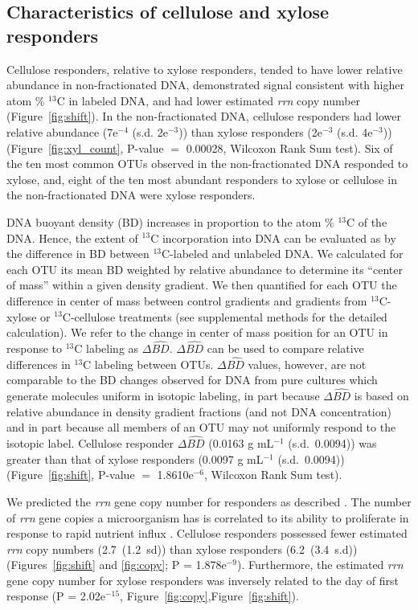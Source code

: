 \subsection{Characteristics of cellulose and xylose responders}
Cellulose responders, relative to xylose responders, tended to have lower
relative abundance in non-fractionated DNA, demonstrated signal consistent with
higher atom \% $^{13}$C in labeled DNA, and had lower estimated \textit{rrn}
copy number (Figure~\ref{fig:shift}). In the non-fractionated DNA, cellulose
responders had lower relative abundance (7e$^{-4}$ (s.d. 2e$^{-3}$)) than
xylose responders (2e$^{-3}$ (s.d. 4e$^{-3}$)) (Figure~\ref{fig:xyl_count},
P-value $=$ 0.00028, Wilcoxon Rank Sum test). Six of the ten most common OTUs
observed in the non-fractionated DNA responded to xylose, and, eight of the ten
most abundant responders to xylose or cellulose in the non-fractionated DNA
were xylose responders.

DNA buoyant density (BD) increases in proportion to the atom \% $^{13}$C of the
DNA. Hence, the extent of $^{13}$C incorporation into DNA can be evaluated as
by the difference in BD between $^{13}$C-labeled and unlabeled DNA. We
calculated for each OTU its mean BD weighted by relative abundance to determine
its “center of mass” within a given density gradient. We then quantified for
each OTU the difference in center of mass between control gradients and
gradients from $^{13}$C-xylose or $^{13}$C-cellulose treatments (see
supplemental methods for the detailed calculation). We refer to the change in
center of mass position for an OTU in response to $^{13}$C labeling as
$\Delta\hat{BD}$. $\Delta\hat{BD}$ can be used to compare relative differences
in $^{13}$C labeling between OTUs. $\Delta\hat{BD}$ values, however, are not
comparable to the BD changes observed for DNA from pure cultures which generate
molecules uniform in isotopic labeling, in part because $\Delta\hat{BD}$ is
based on relative abundance in density gradient fractions (and not DNA
concentration) and in part because all members of an OTU may not uniformly
respond to the isotopic label. Cellulose responder $\Delta\hat{BD}$ (0.0163
g mL$^{-1}$ (s.d.~0.0094)) was greater than that of xylose responders (0.0097
g mL$^{-1}$ (s.d.~0.0094)) (Figure~\ref{fig:shift}, P-value $=$
1.8610e$^{-6}$, Wilcoxon Rank Sum test). 

We predicted the \textit{rrn} gene copy number for responders as described
\citep{Kembel_2012}. The number of \textit{rrn} gene copies a microorganism has
is correlated to its ability to proliferate in response to rapid nutrient
influx \citep{Klappenbach_2000}. Cellulose responders possessed fewer estimated
\textit{rrn} copy numbers (2.7~(1.2~sd)) than xylose responders (6.2~(3.4~s.d))
(Figures~\ref{fig:shift} and \ref{fig:copy}; P = 1.878e$^{-9}$). Furthermore,
the estimated \textit{rrn} gene copy number for xylose responders was inversely
related to the day of first response (P = 2.02e$^{-15}$,
Figure~\ref{fig:copy},Figure~\ref{fig:shift}).

